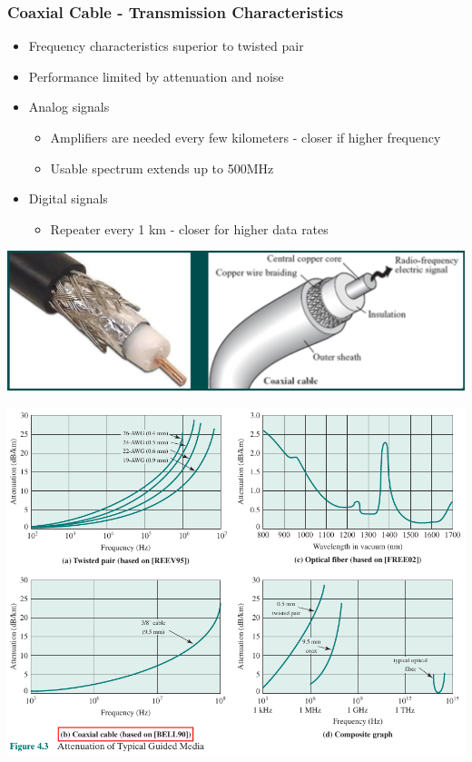\documentclass[pdflatex,compress]{beamer}
\begin{document}
\begin{frame}
	\frametitle{Coaxial Cable - Transmission Characteristics}
	\begin{itemize}
		\item Frequency characteristics superior to twisted pair
		\item Performance limited by attenuation and noise
		\item Analog signals
		\begin{itemize}
			\item  Amplifiers are needed every few kilometers - closer if higher frequency
			\item Usable spectrum extends up to 500MHz
		\end{itemize}
		\item Digital signals
		\begin{itemize}
			\item Repeater every 1 km - closer for higher data rates
		\end{itemize}
	\end{itemize}
	\begin{center}
		\includegraphics[width=0.7\linewidth]{img/img11}
	\end{center}
\end{frame}

\begin{frame}
	\begin{center}
		\includegraphics[width=0.8\linewidth]{img/img12}
	\end{center}
\end{frame}
\end{document}
